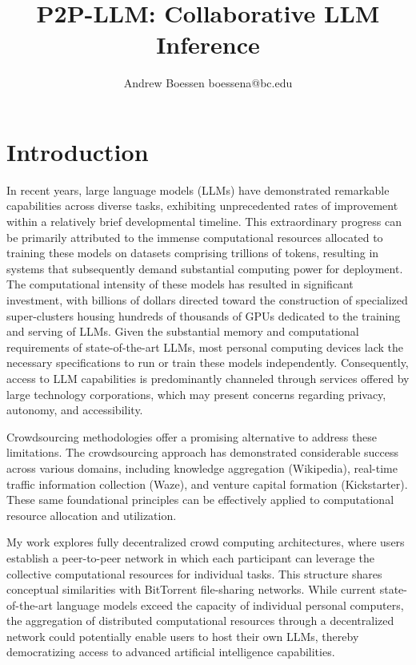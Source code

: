 \documentclass[preprint,twoside,11pt]{article}
\begin{document}
\title{P2P-LLM: Collaborative LLM Inference}

\author{\name Andrew Boessen \email boessena@bc.edu \\
}

\maketitle

\begin{abstract}%
	\blindtext
\end{abstract}

\section{Introduction}

In recent years, large language models (LLMs) have demonstrated remarkable capabilities across diverse tasks,
exhibiting unprecedented rates of improvement within a relatively brief developmental timeline.
This extraordinary progress can be primarily attributed to the immense computational resources allocated to training these models on datasets comprising
trillions of tokens, resulting in systems that subsequently demand substantial computing power for deployment.
The computational intensity of these models has resulted in significant investment,
with billions of dollars directed toward the construction of specialized super-clusters housing hundreds of thousands of GPUs dedicated to the training and serving of LLMs.
Given the substantial memory and computational requirements of state-of-the-art LLMs, most personal computing devices lack the necessary specifications to run or train these models independently.
Consequently, access to LLM capabilities is predominantly channeled through services offered by large technology corporations, which may present concerns regarding privacy, autonomy, and accessibility.

Crowdsourcing methodologies offer a promising alternative to address these limitations.
The crowdsourcing approach has demonstrated considerable success across various domains, including knowledge aggregation (Wikipedia),
real-time traffic information collection (Waze), and venture capital formation (Kickstarter).
These same foundational principles can be effectively applied to computational resource allocation and utilization.

My work explores fully decentralized crowd computing architectures,
where users establish a peer-to-peer network in which each participant can leverage the collective computational resources for individual tasks.
This structure shares conceptual similarities with BitTorrent file-sharing networks.
While current state-of-the-art language models exceed the capacity of individual personal computers,
the aggregation of distributed computational resources through a decentralized network could potentially enable users to host their own LLMs,
thereby democratizing access to advanced artificial intelligence capabilities.
\end{document}
